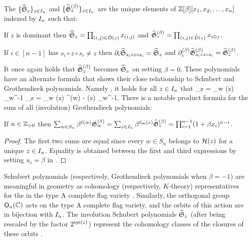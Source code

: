 \documentclass[10pt]{article}
\begin{document}
\begin{definition}
The  $\{\widehat{\mathfrak S}_z\}_{z \in I_n }$
and  $\{\widehat{\mathfrak{G}}^{(\beta)}_z\}_{z\in I_n }$
are the unique elements of $\mathbb{Z}[\beta][x_1,x_2,\dots,x_n]$ indexed by $I_n $ such that:
\ben
\item[(a)] If $z$ is dominant then $\widehat{\mathfrak S}_z=\prod_{(i,j) \in \hat D(z)} x_{(i,j)}$
and $\widehat{\mathfrak{G}}^{(\beta)}_z = \prod_{(i,j) \in \hat D(z)} x_{i\oplus j}$.
\item[(b)] If $i \in [n-1]$ has $s_i \circ z \circ s_i \neq z$ then $\partial_i \widehat{\mathfrak S}_{s_i \circ z \circ s_i} = \widehat{\mathfrak S}_{z}$ and $\partial^{(\beta)}_i \widehat{\mathfrak{G}}^{(\beta)}_{s_i \circ z \circ s_i} = \widehat{\mathfrak{G}}^{(\beta)}_{z}$.
\een
\end{definition}

It once again holds that  $\widehat{\mathfrak{G}}^{(\beta)}_z$ becomes $\widehat{\mathfrak S}_z$ on setting $\beta=0$.
These polynomials have an alternate formula that shows their close relationship
to Schubert and Grothendieck polynomials. Namely \cite[Thms.~3.3 and 3.6]{MarWen}, it holds for all $z \in I_n $ that
\be\label{atom-eq}
\textstyle
\iS_z = \sum_{w \in \cW(z)} \fkS_{w^{-1}}
\qquand
\iG_z = \sum_{w \in \cH(z)} \beta^{\ell(w) - \ellinv(z)} \fkG_{w^{-1}}.
\ee 
There is a notable product formula for the sum of all (involution) Grothendieck polynomials:
\begin{proposition}
\label{prop:partition function inv Grothendieck}
If $n \in \mathbb{Z}_{>0}$ 
then $
\sum_{w \in S_n} \beta^{\ell(w)} \mathfrak{G}^{(\beta)}_w = \sum_{z \in I_n } \beta^{\ell_{\mathsf{inv}}(z)} \widehat{\mathfrak{G}}^{(\beta)}_z =\prod_{i =1}^{n-1} (1+\beta x_i)^{n-i}
$.
\end{proposition}



\begin{proof}
The first two sums are equal since every $w \in S_n$ belongs to $\mathcal H(z)$ for a unique $z \in I_n$.
Equality is obtained between the  first and third expressions by setting $u_i=\beta$ in \cite[Eq.~(2.2) and Thm.~2.3]{fomin1994grothendieck}.
\end{proof}

Schubert polynomials (respectively, Grothendieck polynomials when $\beta=-1$) are meaningful in geometry as
cohomology (respectively, $K$-theory)
representatives for the  in the type A complete flag variety \cite{LasSch}.
Similarly, 
the orthogonal group $\mathsf{O}_n(\mathbb{C})$ acts on the type A complete flag variety,
and the orbits of this action are in bijection with $I_n $.
The involution Schubert polynomials $\widehat{\mathfrak S}_z$ (after being rescaled by the factor $2^{\textsf{cyc}(z)}$) represent the cohomology classes of 
the closures of these orbits  \cite{WyserYong2017}. 
\end{document}
